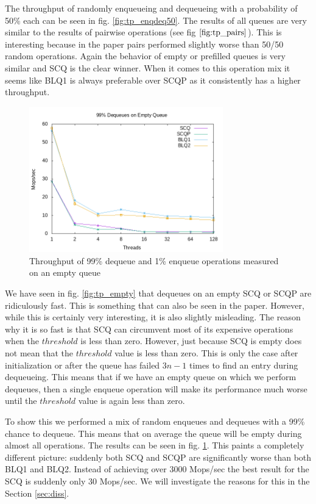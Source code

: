 \documentclass{article}      %
\begin{document}
The throughput of randomly enqueueing and dequeueing  with a probability of 50\% each can be seen in fig. \ref{fig:tp_enqdeq50}. The results of all queues are very similar to the results of pairwise operations (see fig $\ref{fig:tp_pairs}$). This is interesting because in the paper  pairs performed slightly worse than 50/50 random operations.  Again the behavior of empty or prefilled queues is very similar and SCQ is the clear winner. When it comes to this operation mix it seems like BLQ1 is always preferable over SCQP as it consistently has a higher throughput.

\begin{figure}[hbtp]
	\centering
	\includegraphics[width=0.75\textwidth]{Pictures/tp_99deq_empty.png}
	\caption{Throughput of 99\% dequeue and 1\% enqueue operations measured on an empty queue}
	\label{fig:tp_99deq}
\end{figure}


We have seen in fig. \ref{fig:tp_empty} that dequeues on an empty SCQ or SCQP are ridiculously fast. This is something that can also be seen in the paper. However, while this is certainly very interesting, it is also slightly misleading. 
The reason why it is so fast is that SCQ can circumvent most of its expensive operations when the $threshold$ is less than zero. However, just because SCQ is empty does not mean that the $threshold$ value is less than zero. This is only the case after initialization or after the queue has failed $3n - 1$ times to find an entry during dequeueing. This means that if we have an empty queue on which we perform dequeues, then a single enqueue operation will make its performance much worse until the $threshold$ value is again less than zero.

To show this we performed a mix of random enqueues and dequeues with a 99\% chance to dequeue. This means that on average the queue will be empty during almost all operations. The results can be seen in fig. \ref{fig:tp_99deq}. This paints a completely different picture: suddenly both SCQ and SCQP are significantly worse than both BLQ1 and BLQ2. Instead of achieving over 3000 Mops/sec the best result for the SCQ is suddenly only 30 Mops/sec. We will investigate the reasons for this in the Section \ref{sec:diss}.
\end{document}
